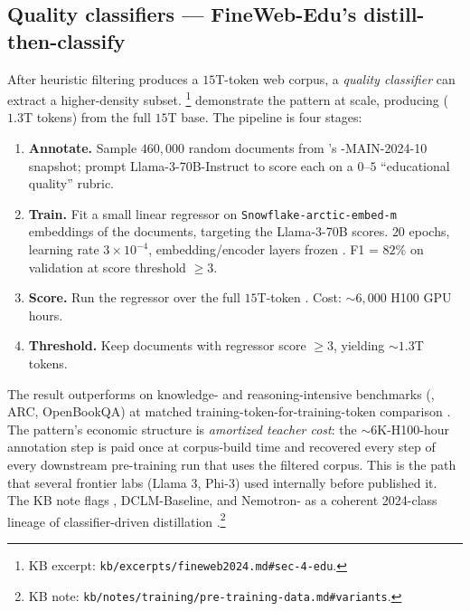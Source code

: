\subsection{Quality classifiers --- FineWeb-Edu's distill-then-classify}
\label{sec:data-edu}

After heuristic filtering produces a $15$T-token web corpus, a
\emph{quality classifier} can extract a higher-density subset.
\citet[\S 4]{fineweb2024}\footnote{KB excerpt:
\texttt{kb/excerpts/fineweb2024.md\#sec-4-edu}.} demonstrate the
pattern at scale, producing  ($1.3$T tokens) from the full
$15$T base. The pipeline is four stages:

\begin{enumerate}
\item \textbf{Annotate.} Sample $460{,}000$ random documents from
's -MAIN-2024-10 snapshot; prompt Llama-3-70B-Instruct to
score each on a $0$--$5$ ``educational quality'' rubric.
\item \textbf{Train.} Fit a small linear regressor on
\texttt{Snowflake-arctic-embed-m} embeddings of the documents,
targeting the Llama-3-70B scores. $20$ epochs, learning rate
$3 \times 10^{-4}$, embedding/encoder layers frozen
\citep[\S 4]{fineweb2024}. F1 = $82\%$ on validation at score
threshold $\geq 3$.
\item \textbf{Score.} Run the regressor over the full $15$T-token
. Cost: $\sim 6{,}000$ H100 GPU hours.
\item \textbf{Threshold.} Keep documents with regressor score
$\geq 3$, yielding $\sim 1.3$T tokens.
\end{enumerate}

The result outperforms  on knowledge- and reasoning-intensive
benchmarks (, ARC, OpenBookQA) at matched
training-token-for-training-token comparison
\citep[abstract]{fineweb2024}. The pattern's economic structure is
\emph{amortized teacher cost}: the $\sim 6$K-H100-hour annotation
step is paid once at corpus-build time and recovered every step of
every downstream pre-training run that uses the filtered corpus.
This is the path that several frontier labs (Llama 3, Phi-3) used
internally before  published it. The KB note flags , DCLM-Baseline, and
Nemotron- as a coherent 2024-class lineage of classifier-driven
distillation \citep[\S
1]{fineweb2024}.\footnote{KB note:
\texttt{kb/notes/training/pre-training-data.md\#variants}.}

